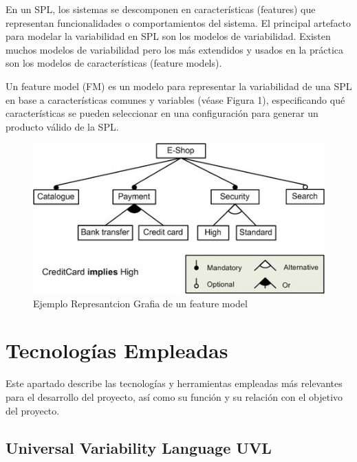 \documentclass[12pt, a4paper, twoside]{article}
\begin{document}
En un SPL, los sistemas se descomponen en características (features) que representan funcionalidades o comportamientos del sistema. 
El principal artefacto para modelar la variabilidad en SPL son los modelos de variabilidad. Existen muchos modelos 
de variabilidad pero los más extendidos y usados en la práctica son los modelos de características (feature models). 

Un feature model (FM) \cite{wikipedia_feature_model} es un modelo para representar la variabilidad de una SPL en base a características comunes y 
variables (véase Figura 1), especificando qué características se pueden seleccionar en una configuración para generar 
un producto válido de la SPL.  

\begin{figure}[ht]
	\centering
		\includegraphics[width=1\textwidth]{fm.example.jpg}
	\caption{Ejemplo Represantcion Grafia de un feature model \cite{wikipedia_feature_model}}
\end{figure}












\section{Tecnologías Empleadas}
\label{sec:Tecnologias Empleadas}
Este apartado describe las tecnologías y herramientas empleadas más relevantes para el desarrollo del proyecto, así como su función y su relación con el objetivo del proyecto.

\subsection{Universal Variability Language UVL}
\end{document}
